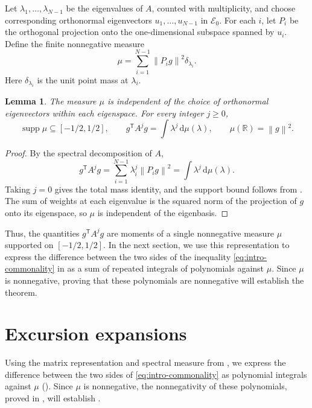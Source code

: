 \documentclass[11pt]{article}
\newtheorem{lemma}[theorem]{Lemma}
\theoremstyle{remark}
\numberwithin{equation}{section}
\newcommand{\R}{\mathbb R}
\newcommand{\norm}[1]{\left\lVert #1\right\rVert}
\newcommand{\dd}{\,\mathrm d}
\newcommand{\supp}{\operatorname{supp}}
\begin{document}
Let $\lambda_1,\ldots,\lambda_{N-1}$ be the eigenvalues of $A$, counted
with multiplicity, and choose corresponding orthonormal eigenvectors
$u_1,\ldots,u_{N-1}$ in $\mathcal E_0$. For each $i$, let $P_i$ be the
orthogonal projection onto the one-dimensional subspace spanned by $u_i$.
Define the finite nonnegative measure
\begin{equation*}
  \mu=\sum_{i=1}^{N-1}\norm{P_ig}^2\delta_{\lambda_i}.
\end{equation*}
Here $\delta_{\lambda_i}$ is the unit point mass at $\lambda_i$.

\begin{lemma}\label{lem:spectral-moments}
  The measure $\mu$ is independent of the choice of orthonormal eigenvectors
  within each eigenspace. For every integer $j\ge0$,
  \begin{equation}\label{eq:moments}
    \supp\mu\subseteq[-1/2,1/2],
    \qquad
    g^{\mathsf T}A^jg=\int\lambda^j\dd\mu(\lambda),
    \qquad
    \mu(\R)=\norm g^2.
  \end{equation}
\end{lemma}

\begin{proof}
  By the spectral decomposition of $A$,
  \[
    g^{\mathsf T}A^jg
    =\sum_{i=1}^{N-1}\lambda_i^j\norm{P_ig}^2
    =\int\lambda^j\dd\mu(\lambda).
  \]
  Taking $j=0$ gives the total mass identity, and the support bound follows from .
  The sum of weights at each eigenvalue is the squared norm of the projection of $g$ onto its eigenspace, so $\mu$ is independent of the eigenbasis.
\end{proof}

Thus, the quantities $g^{\mathsf T}A^jg$ are moments of a single nonnegative measure $\mu$ supported on $[-1/2,1/2]$.
In the next section, we use this representation to express the difference between the two sides of the inequality \eqref{eq:intro-commonality} in  as a sum of repeated integrals of polynomials against $\mu$.
Since $\mu$ is nonnegative, proving that these polynomials are nonnegative will establish the theorem.

\section{Excursion expansions}
\label{sec:excursions}

Using the matrix representation and spectral measure from , we express the difference between the two sides of \eqref{eq:intro-commonality} as polynomial integrals against $\mu$ ().
Since $\mu$ is nonnegative, the nonnegativity of these polynomials, proved in , will establish .
\end{document}
